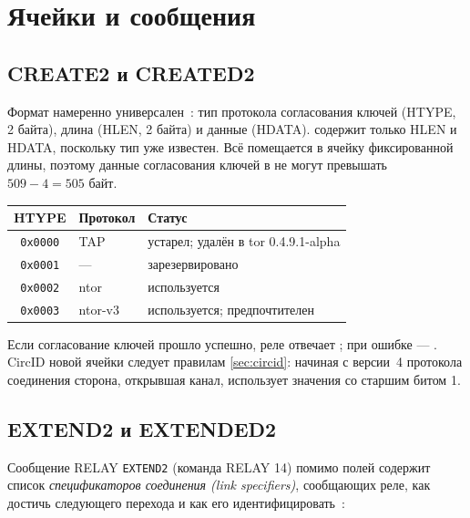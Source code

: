 \section{Ячейки и сообщения}\label{sec:circ-celle}

\subsection{CREATE2 и CREATED2}

Формат  намеренно универсален~: тип протокола согласования ключей (HTYPE, 2 байта), длина (HLEN, 2 байта) и данные (HDATA).  содержит только HLEN и HDATA, поскольку тип уже известен. Всё помещается в ячейку фиксированной длины, поэтому данные согласования ключей в  не могут превышать $509 - 4 = 505$ байт.

\begin{center}
\begin{tabular}{cll}
\toprule
HTYPE & Протокол & Статус \\
\midrule
\texttt{0x0000} & TAP & устарел; удалён в tor 0.4.9.1-alpha \\
\texttt{0x0001} & --- & зарезервировано \\
\texttt{0x0002} & ntor & используется \\
\texttt{0x0003} & ntor-v3 & используется; предпочтителен \\
\bottomrule
\end{tabular}
\end{center}

Если согласование ключей прошло успешно, реле отвечает ; при ошибке --- . CircID новой ячейки следует правилам \cref{sec:circid}: начиная с версии~4 протокола соединения сторона, открывшая канал, использует значения со старшим битом 1.

\subsection{EXTEND2 и EXTENDED2}\label{sec:extend2}

Сообщение RELAY \texttt{EXTEND2} (команда RELAY 14) помимо полей  содержит список \emph{спецификаторов соединения (link specifiers)}, сообщающих реле, как достичь следующего перехода и как его идентифицировать~:

